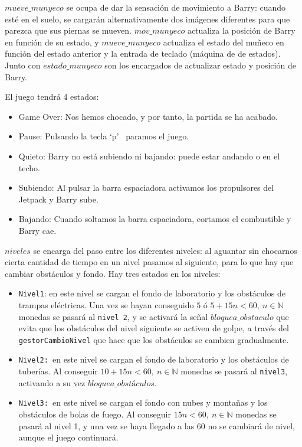 \documentclass[11pt, a4paper, spanish, openright, twoside]{book}
\begin{document}
$mueve\_munyeco$ se ocupa de dar la sensación de movimiento a Barry: cuando esté en el suelo, se cargarán alternativamente dos imágenes diferentes para que parezca que sus piernas se mueven.
$mov\_munyeco$ actualiza la posición de Barry en función de su estado, y $mueve\_munyeco$ actualiza el estado del muñeco en función del estado anterior y la entrada de teclado (máquina de de estados). Junto con $estado\_munyeco$ son los encargados de actualizar estado y posición de Barry.

El juego tendrá 4 estados:
\begin{itemize}
\item Game Over: Nos hemos chocado, y por tanto, la partida se ha acabado.
\item Pause: Pulsando la tecla `p'  \ paramos el juego.
\item Quieto: Barry no está subiendo ni bajando: puede estar andando o en el techo.
\item Subiendo: Al pulsar la barra espaciadora activamos los propulsores del Jetpack y Barry sube.
\item Bajando: Cuando soltamos la barra espaciadora, cortamos el combustible y Barry cae.
 \end{itemize}


$niveles$ se encarga del paso entre los diferentes niveles: al aguantar sin chocarnos cierta cantidad de tiempo en un nivel pasamos al siguiente, para lo que hay que cambiar obstáculos y fondo.
Hay tres estados en los niveles:
\begin{itemize}
\item \texttt{Nivel1}: en este nivel se cargan el fondo de laboratorio y los obstáculos de trampas eléctricas. Una vez se hayan conseguido $5$ ó  $5+15n<60,\ n\in\mathbb{N}$  monedas se pasará al \texttt{nivel 2}, y se activará la señal $bloquea\_obstaculo$ que evita que los obstáculos del nivel siguiente se activen de golpe, a través del \texttt{gestorCambioNivel} que hace que los obstáculos se cambien gradualmente. 
\item \texttt{Nivel2: }en este nivel se cargan el fondo de laboratorio y los obstáculos de tuberías. Al conseguir  $10+15n<60,\ n\in\mathbb{N}$ monedas se pasará al \texttt{nivel3}, activando a su vez $bloquea\_obstáculos$.
\item \texttt{Nivel3: }en este nivel se cargan el fondo con nubes y montañas y los obstáculos de bolas de fuego. Al conseguir $15n<60,\ n\in\mathbb{N}$ monedas se pasará al nivel 1, y una vez se haya llegado a las 60 no se cambiará de nivel, aunque el juego continuará. 
\end{itemize}
\end{document}
